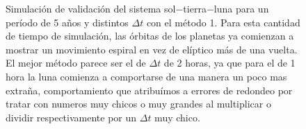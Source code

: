 \begin{figure}
{	\label{fig:ej1_m1_1825_12}
	}
	\caption{
		Simulación de validación del sistema sol$-$tierra$-$luna para un período de 5 años y distintos $\Delta t$
		con el método 1.
		Para esta cantidad de tiempo de simulación, las órbitas de los planetas ya comienzan a mostrar un movimiento espiral en vez de elíptico más de una vuelta.
		El mejor método parece ser el de $\Delta t$ de 2 horas, ya que para el de 1 hora la luna comienza a comportarse de una manera un poco mas extraña,
		comportamiento que atribuímos a errores de redondeo por tratar con numeros muy chicos o muy grandes al multiplicar o dividir respectivamente por un $\Delta t$ muy chico.
	}
	\label{ fig:res_ej1_m1_1825 }
\end{figure}
